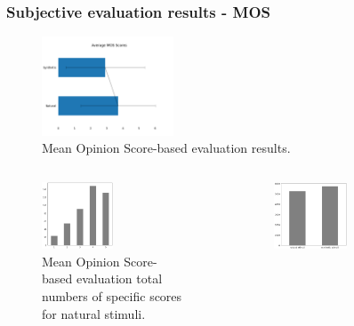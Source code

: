 \documentclass[a4paper,9pt]{beamer}
\theoremstyle{mytheoremstyle}
\begin{document}
\begin{frame}
\frametitle{Subjective evaluation results - MOS}
\begin{figure}
\begin{center}
  \includegraphics[width=0.35\textwidth]{res/MOS-answer}
\end{center}
	\caption{Mean Opinion Score-based evaluation results.}
\end{figure}
\begin{columns}
\begin{figure}
\begin{center}
\includegraphics[width=0.5\textwidth]{res/MOS_number_of_scores_natural_stimuli}
\end{center}
\caption{Mean Opinion Score-based evaluation total numbers of specific scores for natural stimuli.}
\end{figure}
\begin{figure}
\begin{center}
  \includegraphics[width=0.5\textwidth]{res/MOS_stimulus_type_mean_response_time}

\end{center}
\end{figure}
\end{columns}
\end{frame}
\end{document}
